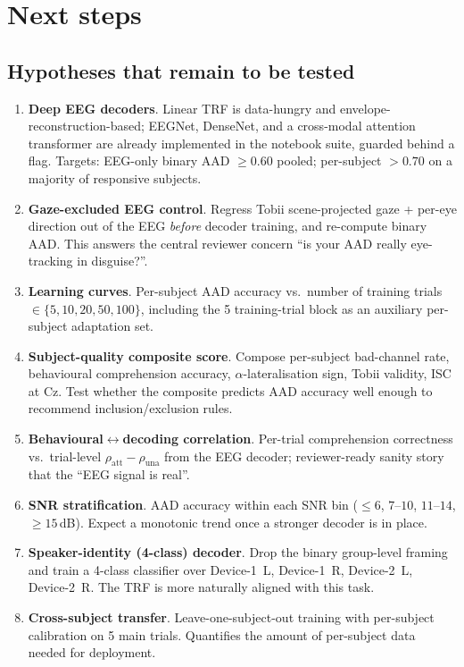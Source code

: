 \chapter{Next steps}
\label{ch:next}

\section{Hypotheses that remain to be tested}

\begin{enumerate}
  \item \textbf{Deep EEG decoders}. Linear TRF is data-hungry and
        envelope-reconstruction-based; EEGNet, DenseNet, and a cross-modal
        attention transformer are already implemented in the notebook
        suite, guarded behind a  flag. Targets: EEG-only
        binary AAD $\geq 0.60$ pooled; per-subject $> 0.70$ on a majority
        of responsive subjects.

  \item \textbf{Gaze-excluded EEG control}. Regress Tobii scene-projected
        gaze + per-eye direction out of the EEG \emph{before} decoder
        training, and re-compute binary AAD. This answers the central
        reviewer concern ``is your AAD really eye-tracking in disguise?''.

  \item \textbf{Learning curves}. Per-subject AAD accuracy vs.\ number of
        training trials $\in \{5, 10, 20, 50, 100\}$, including the 5
        training-trial block as an auxiliary per-subject adaptation set.

  \item \textbf{Subject-quality composite score}. Compose per-subject
        bad-channel rate, behavioural comprehension accuracy,
        $\alpha$-lateralisation sign, Tobii validity, ISC at Cz. Test
        whether the composite predicts AAD accuracy well enough to
        recommend inclusion/exclusion rules.

  \item \textbf{Behavioural$\leftrightarrow$decoding correlation}. Per-trial
        comprehension correctness vs.\ trial-level
        $\rho_\text{att} - \rho_\text{una}$ from the EEG decoder;
        reviewer-ready sanity story that the ``EEG signal is real''.

  \item \textbf{SNR stratification}. AAD accuracy within each SNR bin
        ($\leq 6$, $7$--$10$, $11$--$14$, $\geq 15$\,dB). Expect a
        monotonic trend once a stronger decoder is in place.

  \item \textbf{Speaker-identity (4-class) decoder}. Drop the binary
        group-level framing and train a 4-class classifier over Device-1~L,
        Device-1~R, Device-2~L, Device-2~R. The TRF is more naturally
        aligned with this task.

  \item \textbf{Cross-subject transfer}. Leave-one-subject-out training
        with per-subject calibration on 5 main trials. Quantifies the
        amount of per-subject data needed for deployment.
\end{enumerate}

